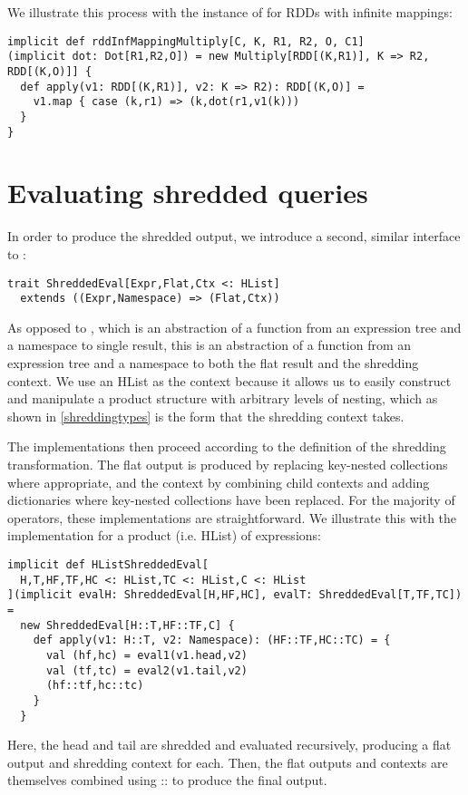 \vs
We illustrate this process with the instance of  for RDDs with infinite mappings:
\vs\begin{lstlisting}
implicit def rddInfMappingMultiply[C, K, R1, R2, O, C1]
(implicit dot: Dot[R1,R2,O]) = new Multiply[RDD[(K,R1)], K => R2, RDD[(K,O)]] {
  def apply(v1: RDD[(K,R1)], v2: K => R2): RDD[(K,O)] =
    v1.map { case (k,r1) => (k,dot(r1,v1(k)))
  }
}
\end{lstlisting}\vs
 
\section{Evaluating shredded queries}

In order to produce the shredded output, we introduce a second, similar interface to :
\vs\begin{lstlisting}
trait ShreddedEval[Expr,Flat,Ctx <: HList]
  extends ((Expr,Namespace) => (Flat,Ctx))
\end{lstlisting}\vs
As opposed to , which is an abstraction of a function from an expression tree and a namespace to single result, this is an abstraction of a function from an expression tree and a namespace to both the flat result and the shredding context. We use an HList as the context because it allows us to easily construct and manipulate a product structure with arbitrary levels of nesting, which as shown in \ref{shreddingtypes} is the form that the shredding context takes.

The implementations then proceed according to the definition of the shredding transformation. The flat output is produced by replacing key-nested collections where appropriate, and the context by combining child contexts and adding dictionaries where key-nested collections have been replaced. For the majority of operators, these implementations are straightforward. We illustrate this with the implementation for a product (i.e. HList) of expressions:
\vs\begin{lstlisting}
implicit def HListShreddedEval[
  H,T,HF,TF,HC <: HList,TC <: HList,C <: HList
](implicit evalH: ShreddedEval[H,HF,HC], evalT: ShreddedEval[T,TF,TC]) =
  new ShreddedEval[H::T,HF::TF,C] {
    def apply(v1: H::T, v2: Namespace): (HF::TF,HC::TC) = {
      val (hf,hc) = eval1(v1.head,v2)
      val (tf,tc) = eval2(v1.tail,v2)
      (hf::tf,hc::tc)
    }
  }
\end{lstlisting}\vs
Here, the head and tail are shredded and evaluated recursively, producing a flat output and shredding context for each. Then, the flat outputs and contexts are themselves combined using :: to produce the final output.


